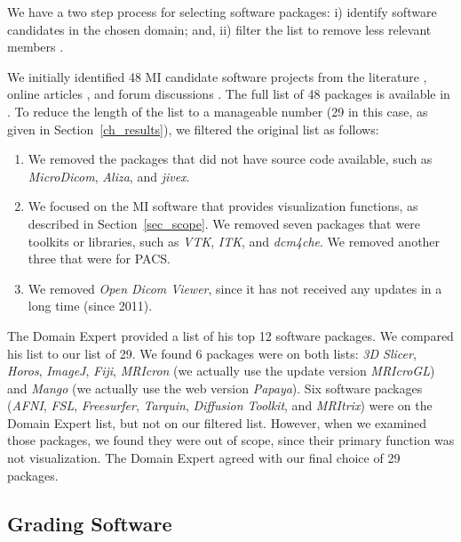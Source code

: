 \documentclass[final, 3p, times, authoryear]{elsarticle}
\begin{document}
We have a two step process for selecting software packages: i) identify software
candidates in the chosen domain; and, ii) filter the list to remove less
relevant members \citep{SmithEtAl2021}.

We initially identified 48 MI candidate software projects from the literature
\citep{Bjorn2017, Bruhschwein2019, Haak2015}, online articles \citep{Emms2019,
Hasan2020, Mu2019}, and forum discussions \citep{Samala2014}.  The full list of
48 packages is available in \citet{Dong2021}.  To reduce the length of the list
to a manageable number (29 in this case, as given in Section~\ref{ch_results}),
we filtered the original list as follows:

\begin{enumerate}

\item We removed the packages that did not have source code available, such as
\textit{MicroDicom}, \textit{Aliza}, and \textit{jivex}.

\item We focused on the MI software that provides visualization functions, as
described in Section~\ref{sec_scope}. We removed seven packages that were
toolkits or libraries, such as \textit{VTK}, \textit{ITK}, and \textit{dcm4che}.
We removed another three that were for PACS.

\item We removed \textit{Open Dicom Viewer}, since it has not received any
updates in a long time (since 2011).

\end{enumerate}

The Domain Expert provided a list of his top 12 software packages.  We compared
his list to our list of 29.  We found 6 packages were on both lists: \textit{3D
Slicer}, \textit{Horos}, \textit{ImageJ}, \textit{Fiji}, \textit{MRIcron} (we
actually use the update version \textit{MRIcroGL}) and \textit{Mango} (we
actually use the web version \textit{Papaya}).  Six software packages
(\textit{AFNI}, \textit{FSL}, \textit{Freesurfer}, \textit{Tarquin},
\textit{Diffusion Toolkit}, and \textit{MRItrix}) were on the Domain Expert
list, but not on our filtered list.  However, when we examined those packages,
we found they were out of scope, since their primary function was not
visualization.  The Domain Expert agreed with our final choice of 29 packages.

\subsection{Grading Software} \label{sec_grading_software}
\end{document}
